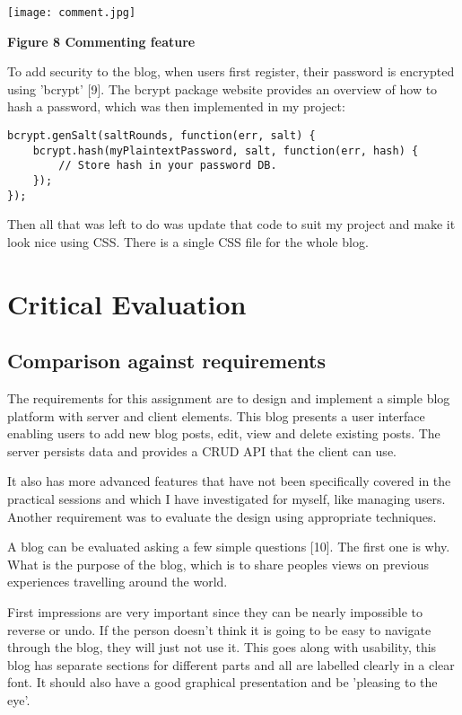 \documentclass[10pt, a4paper]{article}
\begin{document}
    \texttt{[image: comment.jpg]}

    \textbf{Figure 8 Commenting feature}
    \vspace{2mm}

    To add security to the blog, when users first register, their password is encrypted using 'bcrypt' [9]. The bcrypt package website provides an overview of how to hash a password, which was then implemented in my project:

    \begin{lstlisting}[caption = How to hash a password]
bcrypt.genSalt(saltRounds, function(err, salt) {
    bcrypt.hash(myPlaintextPassword, salt, function(err, hash) {
        // Store hash in your password DB.
    });
});
    \end{lstlisting}

    Then all that was left to do was update that code to suit my project and make it look nice using CSS. There is a single CSS file for the whole blog.




    \section{Critical Evaluation}

    \subsection{Comparison against requirements}

The requirements for this assignment are to design and implement a simple blog platform with server and client elements. This blog presents a user interface enabling users to add new blog posts, edit, view and delete existing posts. The server persists data and provides a CRUD API that the client can use.

It also has more advanced features that have not been specifically covered in the practical sessions and which I  have investigated for myself, like managing users. Another requirement was to evaluate the design using appropriate techniques.

A blog can be evaluated asking a few simple questions [10]. The first one is why. What is the purpose of the blog, which is to share peoples views on previous experiences travelling around the world.

First impressions are very important since they can be nearly impossible to reverse or undo. If the person doesn't think it is going to be easy to navigate through the blog, they will just not use it. This goes along with usability, this blog has separate sections for different parts and all are labelled clearly in a clear font. It should also have a good graphical presentation and be 'pleasing to the eye'.
\end{document}
